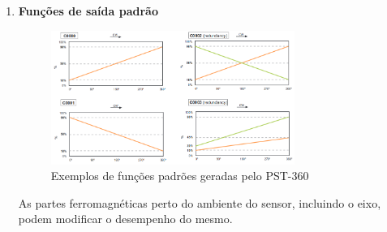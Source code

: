 \begin{enumerate}
\item \textbf{Funções de saída padrão}

\begin{figure}[h]
  \centering
  \includegraphics[width=300px, scale=1]{figuras/pst_saida_padrao}
  \caption{ Exemplos de funções padrões geradas pelo PST-360 \cite{sensor_rotacao}}
\label{fig:pst_saida_padrao}
\end{figure}

As partes ferromagnéticas perto do ambiente do sensor, incluindo o eixo,
podem modificar o desempenho do mesmo.
\end{enumerate}
